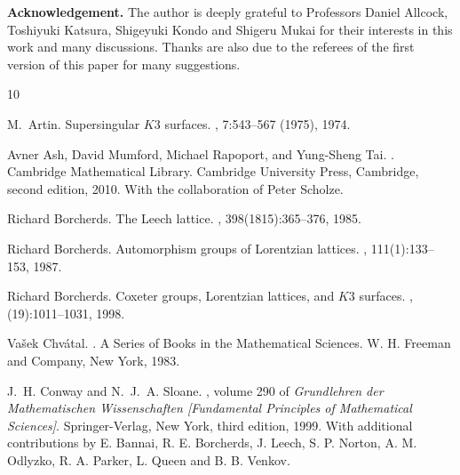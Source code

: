 \documentclass{amsart}
\theoremstyle{plain}
\theoremstyle{definition}
\theoremstyle{remark}
\numberwithin{equation}{section}
\numberwithin{table}{section}
\numberwithin{figure}{section}
\begin{document}
\par 
\medskip
{\bf Acknowledgement.}
The author is deeply grateful to Professors Daniel Allcock,
Toshiyuki Katsura, Shigeyuki Kondo and Shigeru Mukai  for their interests in this work
and many discussions.
%
Thanks are also due to the referees of the first version of this paper for many suggestions.



\def\cftil#1{\ifmmode\setbox7\hbox{$\accent"5E#1$}\else
  \setbox7\hbox{\accent"5E#1}\penalty 10000\relax\fi\raise 1\ht7
  \hbox{\lower1.15ex\hbox to 1\wd7{\hss\accent"7E\hss}}\penalty 10000
  \hskip-1\wd7\penalty 10000\box7} \def\cprime{$'$} \def\cprime{$'$}
  \def\cprime{$'$} \def\cprime{$'$}
\begin{thebibliography}{10}

M.~Artin.
\newblock Supersingular {$K3$} surfaces.
, 7:543--567 (1975), 1974.

Avner Ash, David Mumford, Michael Rapoport, and Yung-Sheng Tai.
.
\newblock Cambridge Mathematical Library. Cambridge University Press,
  Cambridge, second edition, 2010.
\newblock With the collaboration of Peter Scholze.

Richard Borcherds.
\newblock The {L}eech lattice.
, 398(1815):365--376, 1985.

Richard Borcherds.
\newblock Automorphism groups of {L}orentzian lattices.
, 111(1):133--153, 1987.

Richard Borcherds.
\newblock Coxeter groups, {L}orentzian lattices, and {$K3$} surfaces.
, (19):1011--1031, 1998.

Va{\v{s}}ek Chv{\'a}tal.
.
\newblock A Series of Books in the Mathematical Sciences. W. H. Freeman and
  Company, New York, 1983.



J.~H. Conway and N.~J.~A. Sloane.
, volume 290 of {\em
  Grundlehren der Mathematischen Wissenschaften [Fundamental Principles of
  Mathematical Sciences]}.
\newblock Springer-Verlag, New York, third edition, 1999.
\newblock With additional contributions by E. Bannai, R. E. Borcherds, J.
  Leech, S. P. Norton, A. M. Odlyzko, R. A. Parker, L. Queen and B. B. Venkov.
  

\end{thebibliography}
\end{document}
